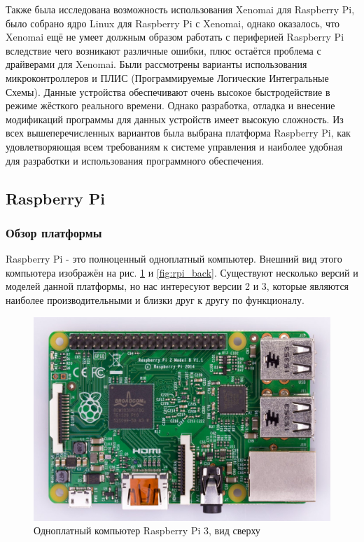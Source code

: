 \documentclass[14pt,russian,a4paper]{extarticle}
\begin{document}
\newline
Также была исследована возможность использования Xenomai для Raspberry Pi, было собрано ядро Linux для Raspberry Pi с Xenomai, однако оказалось, что Xenomai ещё не умеет должным образом работать с периферией Raspberry Pi вследствие чего возникают различные ошибки, плюс остаётся проблема с драйверами для Xenomai.
\newline
Были рассмотрены варианты использования микроконтроллеров и ПЛИС (Программируемые Логические Интегральные Схемы). Данные устройства обеспечивают очень высокое быстродействие в режиме жёсткого реального времени. Однако разработка, отладка и внесение модификаций программы для данных устройств имеет высокую сложность.
\newline
Из всех вышеперечисленных вариантов была выбрана платформа Raspberry Pi, как удовлетворяющая всем требованиям к системе управления и наиболее удобная для разработки и использования программного обеспечения.

\subsection{Raspberry Pi}
\subsubsection{Обзор платформы}
Raspberry Pi - это полноценный одноплатный компьютер. Внешний вид этого компьютера изображён на рис. \ref{fig:rpi_front} и \ref{fig:rpi_back}. Существуют несколько версий и моделей данной платформы, но нас интересуют версии 2 и 3, которые являются наиболее производительными и близки друг к другу по функционалу.
\newline

\begin{figure}[h!]
    \centerline{\includegraphics[width=400pt]{media/rpi_layout_front.jpg}}
    \caption{Одноплатный компьютер Raspberry Pi 3, вид сверху}
    \label{fig:rpi_front}
\end{figure}
\end{document}
